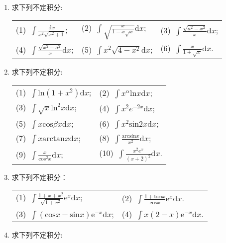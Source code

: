 \begin{enumerate}
\begin{table}[H]
\begin{tabular}{llll}
\end{tabular}
\end{table}
\item 求下列不定积分:
\begin{table}[H]
	\begin{tabular}{lll}
		(1)\ $\int \frac{\mathrm{d}x}{x^2\sqrt{x^2+1}}$;\qquad \qquad \qquad &(2)\ $\int \sqrt{\frac{x}{1-x\sqrt{x}}}\mathrm{d}x$;\qquad \qquad \qquad&(3)\ $\int \frac{\sqrt{a^2-x^2}}{x}\mathrm{d}x$;\\
		(4)\ $\int \frac{\sqrt{x^2-a^2}}{x}\mathrm{d}x$;\qquad \qquad \qquad&(5)\ $\int x^2\sqrt{4-x^2}\mathrm{d}x$;\qquad \qquad &(6)\ $\int \frac{x}{1+\sqrt{x}}\mathrm{d}x$.
	\end{tabular}
\end{table}
\item 求下列不定积分:
\begin{table}[H]
	\begin{tabular}{ll}
		(1)\ $\int \mathrm{ln}(1+x^2)\mathrm{d}x$;\qquad \qquad \qquad \qquad &(2)\ $\int x^\alpha\mathrm{ln}x\mathrm{d}x$;\\
		(3)\ $\int \sqrt{x}\mathrm{ln}^2x\mathrm{d}x$;\qquad \qquad \qquad \qquad &(4)\ $\int x^2e^{-2x}\mathrm{d}x$;\\
		(5)\ $\int x\mathrm{cos}\beta x\mathrm{d}x$;\qquad \qquad \qquad \qquad &(6)\ $\int x^2\mathrm{sin}2x\mathrm{d}x$;\\
		(7)\ $\int x\mathrm{arctan}x \mathrm{d}x$;\qquad \qquad \qquad \qquad &(8)\ $\int \frac{\mathrm{arcsin}x}{x^2}\mathrm{d}x$;\\
		(9)\ $\int \frac{x}{\mathrm{cos}^2x}\mathrm{d}x$;\qquad \qquad \qquad \qquad &(10)\ $\int \frac{x^2e^x}{(x+2)^2}\mathrm{d}x$.
	\end{tabular}
\end{table}
\item 求下列不定积分：
\begin{table}[H]
	\begin{tabular}{ll}
(1)\ $\int \frac{1+x+x^2}{\sqrt{1+x^2}}\mathrm{e}^x\mathrm{d}x$;\qquad \qquad \qquad \qquad &(2)\ $\int \frac{1+\mathrm{tan}x}{\mathrm{cos}x}\mathrm{e}^x\mathrm{d}x$.\\
(3)\ $\int (\mathrm{cos}x-\mathrm{sin}x)\mathrm{e}^{-x}\mathrm{d}x$;\qquad \qquad \qquad \qquad &(4)\ $\int x(2-x)\mathrm{e}^{-x}\mathrm{d}x$.
	\end{tabular}
\end{table}
\item 求下列不定积分:
\begin{table}[H]

\end{table}
\end{enumerate}
